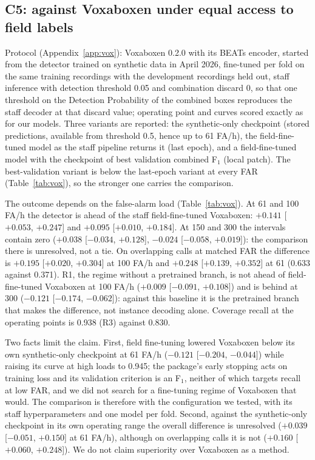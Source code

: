 \documentclass[10pt,twocolumn]{article}
\newcommand{\Fone}{F$_1$}
\begin{document}
\subsection{C5: against Voxaboxen under equal access to field labels}
\label{sec:vox}
Protocol (Appendix~\ref{app:vox}): Voxaboxen 0.2.0 with its BEATs encoder, started from the detector trained on synthetic data in April 2026, fine-tuned per fold on the same training recordings with the development recordings held out, staff inference with detection threshold 0.05 and combination discard 0, so that one threshold on the Detection Probability of the combined boxes reproduces the staff decoder at that discard value; operating point and curves scored exactly as for our models. Three variants are reported: the synthetic-only checkpoint (stored predictions, available from threshold 0.5, hence up to 61 FA/h), the field-fine-tuned model as the staff pipeline returns it (last epoch), and a field-fine-tuned model with the checkpoint of best validation combined \Fone{} (local patch). The best-validation variant is below the last-epoch variant at every FAR (Table~\ref{tab:vox}), so the stronger one carries the comparison.

The outcome depends on the false-alarm load (Table~\ref{tab:vox}). At 61 and 100 FA/h the detector is ahead of the staff field-fine-tuned Voxaboxen: $+0.141$ [$+0.053$, $+0.247$] and $+0.095$ [$+0.010$, $+0.184$]. At 150 and 300 the intervals contain zero ($+0.038$ [$-0.034$, $+0.128$], $-0.024$ [$-0.058$, $+0.019$]): the comparison there is unresolved, not a tie. On overlapping calls at matched FAR the difference is $+0.195$ [$+0.020$, $+0.304$] at 100 FA/h and $+0.248$ [$+0.139$, $+0.352$] at 61 (0.633 against 0.371). R1, the regime without a pretrained branch, is not ahead of field-fine-tuned Voxaboxen at 100 FA/h ($+0.009$ [$-0.091$, $+0.108$]) and is behind at 300 ($-0.121$ [$-0.174$, $-0.062$]): against this baseline it is the pretrained branch that makes the difference, not instance decoding alone. Coverage recall at the operating points is 0.938 (R3) against 0.830.

Two facts limit the claim. First, field fine-tuning lowered Voxaboxen below its own synthetic-only checkpoint at 61 FA/h ($-0.121$ [$-0.204$, $-0.044$]) while raising its curve at high loads to 0.945; the package's early stopping acts on training loss and its validation criterion is an \Fone{}, neither of which targets recall at low FAR, and we did not search for a fine-tuning regime of Voxaboxen that would. The comparison is therefore with the configuration we tested, with its staff hyperparameters and one model per fold. Second, against the synthetic-only checkpoint in its own operating range the overall difference is unresolved ($+0.039$ [$-0.051$, $+0.150$] at 61 FA/h), although on overlapping calls it is not ($+0.160$ [$+0.060$, $+0.248$]). We do not claim superiority over Voxaboxen as a method.
\end{document}
